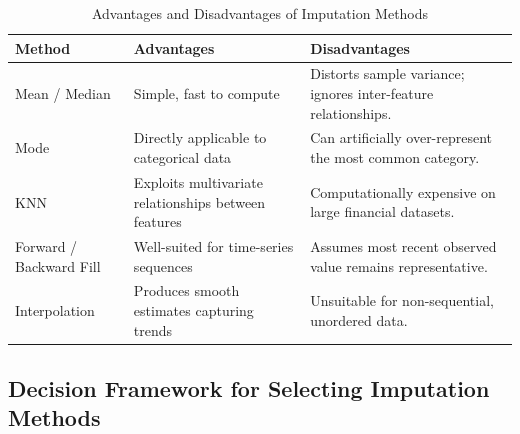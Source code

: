 \begin{table}[htbp]
\centering
\caption{Advantages and Disadvantages of Imputation Methods}
\vspace{0.2em}
\begin{tabularx}{\textwidth}{p{3.2cm}p{4.8cm}X}
\toprule
\textbf{Method} & \textbf{Advantages} & \textbf{Disadvantages} \\
\midrule
Mean / Median & Simple, fast to compute & Distorts sample variance; ignores inter-feature relationships. \\
\addlinespace[0.4em]
Mode & Directly applicable to categorical data & Can artificially over-represent the most common category. \\
\addlinespace[0.4em]
KNN & Exploits multivariate relationships between features & Computationally expensive on large financial datasets. \\
\addlinespace[0.4em]
Forward / Backward Fill & Well-suited for time-series sequences & Assumes most recent observed value remains representative. \\
\addlinespace[0.4em]
Interpolation & Produces smooth estimates capturing trends & Unsuitable for non-sequential, unordered data. \\
\bottomrule
\end{tabularx}
\end{table}

\subsection{Decision Framework for Selecting Imputation Methods}

